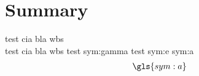 \section*{Summary}\label{cha:summary}
test \gls{cia} bla \gls{wbs} \\ test \gls{cia} bla \gls{wbs} test \gls{sym:gamma} test \gls{sym:e}
\gls{sym:a}
\begin{align}
\gls{sym:a}
\end{align}
